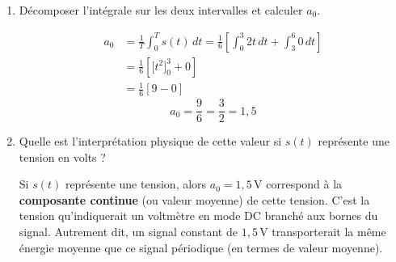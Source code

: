 \documentclass[a4paper,11pt]{article}
\begin{document}
\begin{enumerate}[label=\textbf{\alph*)}]
  \item Décomposer l'intégrale sur les deux intervalles et calculer $a_0$.
  \begin{tcolorbox}[corrigebox]
    \begin{align*}
      a_0 &= \frac{1}{T}\int_0^T s(t)\,dt = \frac{1}{6}\left[\int_0^3 2t\,dt + \int_3^6 0\,dt\right] \\
          &= \frac{1}{6}\left[\Big[t^2\Big]_0^3 + 0\right] \\
          &= \frac{1}{6}\left[9 - 0\right]
    \end{align*}
    \[\boxed{a_0 = \frac{9}{6} = \frac{3}{2} = 1{,}5}\]
  \end{tcolorbox}

  \item Quelle est l'interprétation physique de cette valeur si $s(t)$ représente une tension en volts ?
  \begin{tcolorbox}[corrigebox]
    Si $s(t)$ représente une tension, alors $a_0 = 1{,}5$\,V correspond à la \textbf{composante continue} (ou valeur moyenne) de cette tension. C'est la tension qu'indiquerait un voltmètre en mode DC branché aux bornes du signal. Autrement dit, un signal constant de $1{,}5$\,V transporterait la même énergie moyenne que ce signal périodique (en termes de valeur moyenne).
  \end{tcolorbox}
\end{enumerate}
\end{document}
